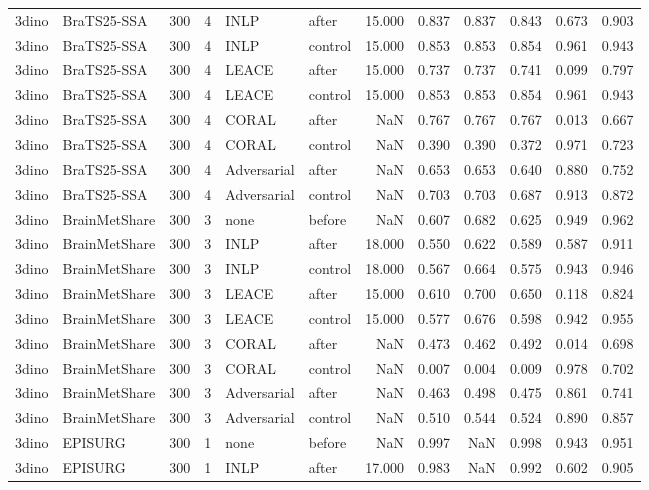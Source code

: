 \begin{tabular}{llrrllrrrrrr}
3dino & BraTS25-SSA & 300 & 4 & INLP & after & 15.000 & 0.837 & 0.837 & 0.843 & 0.673 & 0.903 \\
3dino & BraTS25-SSA & 300 & 4 & INLP & control & 15.000 & 0.853 & 0.853 & 0.854 & 0.961 & 0.943 \\
3dino & BraTS25-SSA & 300 & 4 & LEACE & after & 15.000 & 0.737 & 0.737 & 0.741 & 0.099 & 0.797 \\
3dino & BraTS25-SSA & 300 & 4 & LEACE & control & 15.000 & 0.853 & 0.853 & 0.854 & 0.961 & 0.943 \\
3dino & BraTS25-SSA & 300 & 4 & CORAL & after & NaN & 0.767 & 0.767 & 0.767 & 0.013 & 0.667 \\
3dino & BraTS25-SSA & 300 & 4 & CORAL & control & NaN & 0.390 & 0.390 & 0.372 & 0.971 & 0.723 \\
3dino & BraTS25-SSA & 300 & 4 & Adversarial & after & NaN & 0.653 & 0.653 & 0.640 & 0.880 & 0.752 \\
3dino & BraTS25-SSA & 300 & 4 & Adversarial & control & NaN & 0.703 & 0.703 & 0.687 & 0.913 & 0.872 \\
3dino & BrainMetShare & 300 & 3 & none & before & NaN & 0.607 & 0.682 & 0.625 & 0.949 & 0.962 \\
3dino & BrainMetShare & 300 & 3 & INLP & after & 18.000 & 0.550 & 0.622 & 0.589 & 0.587 & 0.911 \\
3dino & BrainMetShare & 300 & 3 & INLP & control & 18.000 & 0.567 & 0.664 & 0.575 & 0.943 & 0.946 \\
3dino & BrainMetShare & 300 & 3 & LEACE & after & 15.000 & 0.610 & 0.700 & 0.650 & 0.118 & 0.824 \\
3dino & BrainMetShare & 300 & 3 & LEACE & control & 15.000 & 0.577 & 0.676 & 0.598 & 0.942 & 0.955 \\
3dino & BrainMetShare & 300 & 3 & CORAL & after & NaN & 0.473 & 0.462 & 0.492 & 0.014 & 0.698 \\
3dino & BrainMetShare & 300 & 3 & CORAL & control & NaN & 0.007 & 0.004 & 0.009 & 0.978 & 0.702 \\
3dino & BrainMetShare & 300 & 3 & Adversarial & after & NaN & 0.463 & 0.498 & 0.475 & 0.861 & 0.741 \\
3dino & BrainMetShare & 300 & 3 & Adversarial & control & NaN & 0.510 & 0.544 & 0.524 & 0.890 & 0.857 \\
3dino & EPISURG & 300 & 1 & none & before & NaN & 0.997 & NaN & 0.998 & 0.943 & 0.951 \\
3dino & EPISURG & 300 & 1 & INLP & after & 17.000 & 0.983 & NaN & 0.992 & 0.602 & 0.905 \\

\end{tabular}
